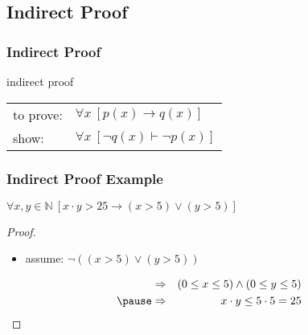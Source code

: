 \documentclass[dvipsnames]{beamer}
\begin{document}
\subsection{Indirect Proof}

\begin{frame}
  \frametitle{Indirect Proof}

  \begin{block}{indirect proof}
    \begin{tabular}{ll}
      to prove: & $\forall x~[p(x) \rightarrow q(x)]$\\
      show:     & $\forall x~[\neg q(x) \vdash \neg p(x)]$
    \end{tabular}
  \end{block}
\end{frame}

\begin{frame}
  \frametitle{Indirect Proof Example}

  \begin{theorem}
    $\forall x,y \in \mathbb{N}~[x \cdot y > 25
      \rightarrow (x > 5) \vee (y > 5)]$
  \end{theorem}

  \pause
  \begin{proof}
    \begin{itemize}
      \item assume: $\neg ((x > 5) \vee (y > 5))$
    \end{itemize}

    \vspace{-2em}
    \begin{eqnarray*}
      & \Rightarrow & (0 \leq x \leq 5) \wedge (0 \leq y \leq 5)\\\pause
      & \Rightarrow & x \cdot y \leq 5 \cdot 5 = 25
    \end{eqnarray*}
  \end{proof}
\end{frame}
\end{document}
